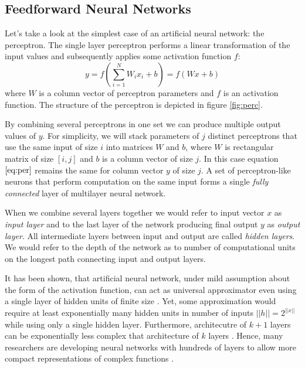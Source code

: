 \subsection{Feedforward Neural Networks}
\label{ch:ffnn}

Let's take a look at the simplest case of an artificial neural network: the perceptron.
The single layer perceptron performs a linear transformation of the input values and subsequently applies some activation function $f$:
\begin{equation}\label{eq:per}
  y = f(\sum_{i=1}^N W_ix_i + b) = f(Wx+b)
\end{equation}
where $W$ is a column vector of perceptron parameters and $f$ is an activation function. The structure of the perceptron is depicted in figure \ref{fig:perc}.



By combining several perceptrons in one set we can produce multiple output values of $y$.
For simplicity, we will stack parameters of $j$ distinct perceptrons that use the same input of size $i$ into matrices $W$ and $b$, where $W$ is rectangular matrix of size $[i,j]$ and $b$ is a column vector of size $j$.
In this case equation $\ref{eq:per}$ remains the same for column vector $y$ of size $j$. A set of perceptron-like neurons that perform computation on the same input forms a single \textit{fully connected} layer of multilayer neural network.

When we combine several layers together we would refer to input vector $x$ as \textit{input layer} and to the last layer of the network producing final output $y$ as \textit{output layer}. All intermediate layers between input and output are called \textit{hidden layers}. We would refer to the depth of the network as to number of computational units on the longest path connecting input and output layers.

It has been shown, that artificial neural network, under mild assumption about the form of the activation function, can act as universal approximator even using a single layer of hidden units of finite size \cite{Debao1993}. Yet, some approximation would require at least exponentially many hidden units in number of inputs $||h||=2^{||x||}$ \cite{Pascanu2014} while using only a single hidden layer. Furthermore, architecutre of $k+1$ layers can be exponentially less complex that architecture of $k$ layers \cite{Bengio2009a}.
Hence, many researchers are developing neural networks with hundreds of layers to allow more compact representations of complex functions \cite{He2015, Srivastava2015}.

